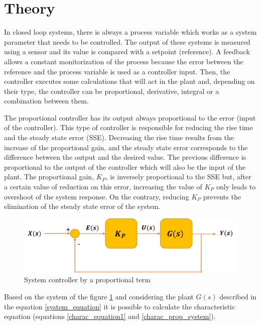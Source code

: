 \section{Theory}

In closed loop systems, there is always a process variable which works as a system parameter that needs to be controlled. The output of these systems is measured using a sensor and its value is compared with a setpoint (reference). A feedback allows a constant monitorization of the process because the error between the reference and the process variable is used as a controller input. Then, the controller executes some calculations that will act in the plant and, depending on their type, the controller can be proportional, derivative, integral or a combination between them. %

The proportional controller has its output always proportional to the error (input of the controller). This type of controller is responsible for reducing the rise time and the steady state error (SSE). Decreasing the rise time results from the increase of the proportional gain, and the steady state error corresponds to the difference between the output and the desired value. The previous difference is proportional to the output of the controller which will also be the input of the plant. The proportional gain, $K_P$, is inversely proportional to the SSE but, after a certain value of reduction on this error, increasing the value of $K_P$ only leads to overshoot of the system response. On the contrary, reducing $K_P$ prevents the elimination of the steady state error of the system. 

\begin{figure}[H]
	\centering
	\includegraphics[scale=0.6]{figures/propor_controller.png}
	\caption{System controller by a proportional term}
	\label{propor_controller}
\end{figure}

Based on the system of the figure \ref{propor_controller} and considering the plant $G(s)$ described in the equation \ref{system_equation} it is possible to calculate the characteristic equation (equations \ref{charac_equation1} and \ref{charac_prop_system}).

